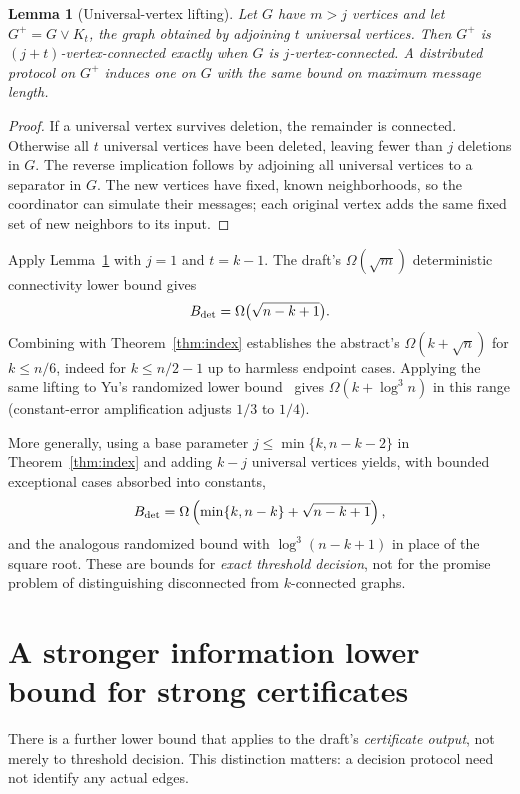 \documentclass[11pt]{article}
\newtheorem{lemma}[theorem]{Lemma}
\theoremstyle{remark}\newtheorem{remark}[theorem]{Remark}
\begin{document}
\begin{lemma}[Universal-vertex lifting]\label{lem:join}
Let $G$ have $m>j$ vertices and let $G^+=G\vee K_t$, the graph obtained by adjoining $t$ universal vertices. Then $G^+$ is $(j+t)$-vertex-connected exactly when $G$ is $j$-vertex-connected. A distributed protocol on $G^+$ induces one on $G$ with the same bound on maximum message length.
\end{lemma}
\begin{proof}
If a universal vertex survives deletion, the remainder is connected. Otherwise all $t$ universal vertices have been deleted, leaving fewer than $j$ deletions in $G$. The reverse implication follows by adjoining all universal vertices to a separator in $G$. The new vertices have fixed, known neighborhoods, so the coordinator can simulate their messages; each original vertex adds the same fixed set of new neighbors to its input.
\end{proof}

Apply Lemma~\ref{lem:join} with $j=1$ and $t=k-1$. The draft's $\Omega(\sqrt m)$ deterministic connectivity lower bound gives
\[
 B_{\rm det}=\Omega\bigl(\sqrt{n-k+1}\bigr).
\]
Combining with Theorem~\ref{thm:index} establishes the abstract's $\Omega(k+\sqrt n)$ for $k\le n/6$, indeed for $k\le n/2-1$ up to harmless endpoint cases. Applying the same lifting to Yu's randomized lower bound~\cite{Yu21} gives $\Omega(k+\log^3 n)$ in this range (constant-error amplification adjusts $1/3$ to $1/4$).

More generally, using a base parameter $j\le\min\{k,n-k-2\}$ in Theorem~\ref{thm:index} and adding $k-j$ universal vertices yields, with bounded exceptional cases absorbed into constants,
\[
 B_{\rm det}=\Omega\left(\min\{k,n-k\}+\sqrt{n-k+1}\right),
\]
and the analogous randomized bound with $\log^3(n-k+1)$ in place of the square root. These are bounds for \emph{exact threshold decision}, not for the promise problem of distinguishing disconnected from $k$-connected graphs.

\section{A stronger information lower bound for strong certificates}\label{sec:certificate-lower}
There is a further lower bound that applies to the draft's \emph{certificate output}, not merely to threshold decision. This distinction matters: a decision protocol need not identify any actual edges.
\end{document}
